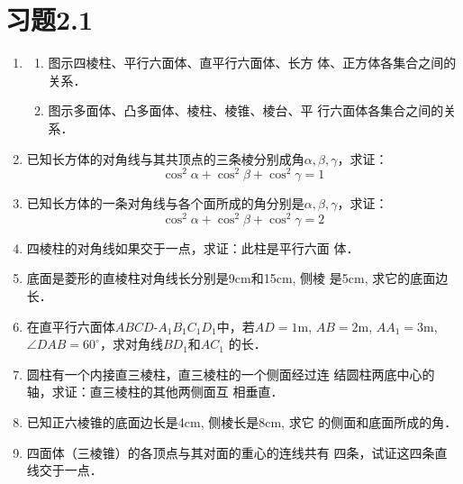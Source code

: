 \section*{习题2.1}

\begin{enumerate}
    \item \begin{enumerate}
        \item 图示四棱柱、平行六面体、直平行六面体、长方
    体、正方体各集合之间的关系．
    \item 图示多面体、凸多面体、棱柱、棱锥、棱台、平
    行六面体各集合之间的关系．
    \end{enumerate}
   
    \item 已知长方体的对角线与其共顶点的三条棱分别成角$\alpha,\beta,\gamma$，求证：
    \[\cos^2\alpha+\cos^2\beta+\cos^2\gamma=1\]
    \item 已知长方体的一条对角线与各个面所成的角分别是$\alpha,\beta,\gamma$，求证：\[\cos^2\alpha+\cos^2\beta+\cos^2\gamma=2\]
    \item 四棱柱的对角线如果交于一点，求证：此柱是平行六面
    体．
    \item 底面是菱形的直棱柱对角线长分别是9cm和15cm, 侧棱
    是5cm, 求它的底面边长．
    \item 在直平行六面体$ABCD$-$A_1B_1C_1D_1$中，若$AD=1$m,
    $AB=2$m, $AA_1=3$m, $\angle DAB=60^{\circ}$，求对角线$BD_1$和$AC_1$
    的长．
    \item 圆柱有一个内接直三棱柱，直三棱柱的一个侧面经过连
    结圆柱两底中心的轴，求证：直三棱柱的其他两侧面互
    相垂直．
    \item 已知正六棱锥的底面边长是4cm, 侧棱长是8cm, 求它
    的侧面和底面所成的角．
    \item 四面体（三棱锥）的各顶点与其对面的重心的连线共有
    四条，试证这四条直线交于一点．


\end{enumerate}
